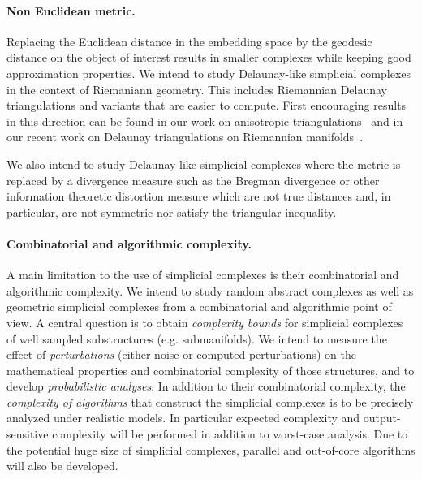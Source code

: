 \paragraph{Non Euclidean metric.}
Replacing the Euclidean distance in the embedding space by the geodesic distance on the object of interest results in smaller complexes while keeping good approximation properties. We intend to study Delaunay-like simplicial complexes in the context of Riemaniann geometry. This includes Riemannian Delaunay triangulations and variants that are easier to compute. First encouraging results in this direction can be found in our work on anisotropic triangulations~\cite{bwy-luam-08} and in our recent work on Delaunay triangulations on Riemannian manifolds~\cite{boissonnat2012stab}. 


We also intend to study Delaunay-like simplicial complexes where the metric is replaced by a divergence measure such as the Bregman divergence or other information theoretic distortion measure which are not true distances and, in particular, are not symmetric nor satisfy the triangular inequality.


\paragraph{Combinatorial and algorithmic complexity.}
A main limitation to the use of simplicial complexes is their combinatorial and algorithmic complexity. %
We intend to study random abstract complexes as well as geometric simplicial complexes from a combinatorial and algorithmic point of view. A central question is to obtain {\em complexity bounds} for simplicial complexes of well sampled substructures (e.g. submanifolds).  We intend to measure the effect of {\em perturbations} (either noise or computed perturbations) on the mathematical properties and combinatorial complexity of those structures, and to develop {\em probabilistic analyses}. 
In addition to their combinatorial complexity, the {\em complexity of algorithms} that construct the simplicial complexes is to be precisely analyzed under realistic models. In particular expected complexity and output-sensitive complexity will be performed in addition to worst-case analysis. Due to the potential huge size of simplicial complexes, parallel and out-of-core algorithms will also be developed. %



